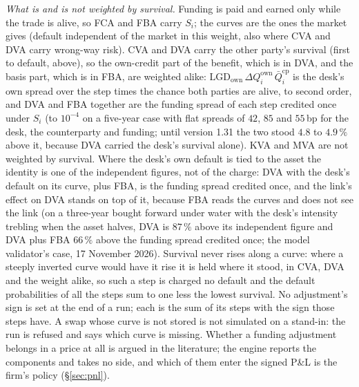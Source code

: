 \documentclass[11pt,a4paper]{article}
\begin{document}
\emph{What is and is not weighted by survival.} Funding is paid and earned only while the trade is alive, so FCA and FBA carry $S_i$; the curves are the ones the market gives (default independent of the market in this weight, also where CVA and DVA carry wrong-way risk). CVA and DVA carry the other party's survival (first to default, above), so the own-credit part of the benefit, which is in DVA, and the basis part, which is in FBA, are weighted alike: $\mathrm{LGD}_{\mathrm{own}}\,\Delta Q^{\mathrm{own}}_i\,\bar Q^{\mathrm{cp}}_i$ is the desk's own spread over the step times the chance both parties are alive, to second order, and DVA and FBA together are the funding spread of each step credited once under $S_i$ (to $10^{-4}$ on a five-year case with flat spreads of $42$, $85$ and $55$\,bp for the desk, the counterparty and funding; until version 1.31 the two stood $4.8$ to $4.9\,\%$ above it, because DVA carried the desk's survival alone). KVA and MVA are not weighted by survival. Where the desk's own default is tied to the asset the identity is one of the independent figures, not of the charge: DVA with the desk's default on its curve, plus FBA, is the funding spread credited once, and the link's effect on DVA stands on top of it, because FBA reads the curves and does not see the link (on a three-year bought forward under water with the desk's intensity trebling when the asset halves, DVA is $87\,\%$ above its independent figure and DVA plus FBA $66\,\%$ above the funding spread credited once; the model validator's case, 17 November 2026). Survival never rises along a curve: where a steeply inverted curve would have it rise it is held where it stood, in CVA, DVA and the weight alike, so such a step is charged no default and the default probabilities of all the steps sum to one less the lowest survival. No adjustment's sign is set at the end of a run; each is the sum of its steps with the sign those steps have. A swap whose curve is not stored is not simulated on a stand-in: the run is refused and says which curve is missing. Whether a funding adjustment belongs in a price at all is argued in the literature; the engine reports the components and takes no side, and which of them enter the signed P\&L is the firm's policy (\S\ref{sec:pnl}).
\end{document}
